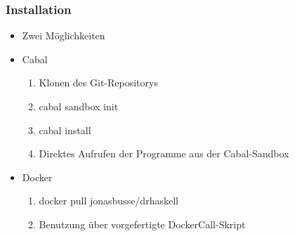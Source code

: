 \begin{frame}
	\frametitle{Installation}
	\begin{itemize}[<+->]
		\item{Zwei Möglichkeiten}
		\item{Cabal}
			\begin{enumerate}
				\item{Klonen des Git-Repositorys}
				\item{cabal sandbox init}
				\item{cabal install}
				\item{Direktes Aufrufen der Programme aus der Cabal-Sandbox}
			\end{enumerate}
		\item{Docker}
			\begin{enumerate}
				\item{docker pull jonasbusse/drhaskell}
				\item{Benutzung über vorgefertigte DockerCall-Skript}
			\end{enumerate}
	\end{itemize}
\end{frame}